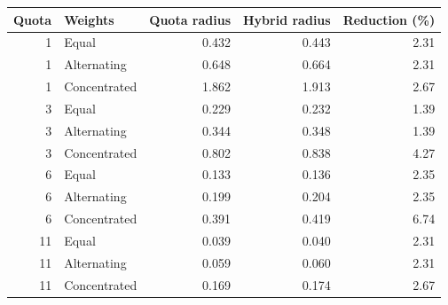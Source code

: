 \begin{tabular}{rlrrr}
\toprule
Quota & Weights & Quota radius & Hybrid radius & Reduction (\%)\\
\midrule
1 & Equal & 0.432 & 0.443 & 2.31\\
1 & Alternating & 0.648 & 0.664 & 2.31\\
1 & Concentrated & 1.862 & 1.913 & 2.67\\
3 & Equal & 0.229 & 0.232 & 1.39\\
3 & Alternating & 0.344 & 0.348 & 1.39\\
3 & Concentrated & 0.802 & 0.838 & 4.27\\
6 & Equal & 0.133 & 0.136 & 2.35\\
6 & Alternating & 0.199 & 0.204 & 2.35\\
6 & Concentrated & 0.391 & 0.419 & 6.74\\
11 & Equal & 0.039 & 0.040 & 2.31\\
11 & Alternating & 0.059 & 0.060 & 2.31\\
11 & Concentrated & 0.169 & 0.174 & 2.67\\
\bottomrule
\end{tabular}
